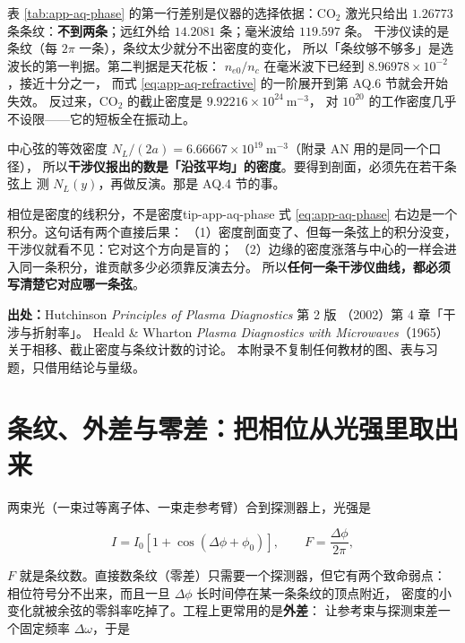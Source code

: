 表 \ref{tab:app-aq-phase} 的第一行差别是仪器的选择依据：CO$_2$ 激光只给出
$1.26773$ 条条纹：\textbf{不到两条}；远红外给 $14.2081$ 条；毫米波给 $119.597$ 条。
干涉仪读的是条纹（每 $2\pi$ 一条），条纹太少就分不出密度的变化，
所以「条纹够不够多」是选波长的第一判据。第二判据是天花板：
$n_{e0}/n_c$ 在毫米波下已经到 $8.96978\times10^{-2}$，接近十分之一，
而式 \eqref{eq:app-aq-refractive} 的一阶展开到第 AQ.6 节就会开始失效。
反过来，CO$_2$ 的截止密度是 $9.92216\times10^{24}\ \mathrm{m^{-3}}$，
对 $10^{20}$ 的工作密度几乎不设限——它的短板全在振动上。

中心弦的等效密度
$N_L/(2a) = 6.66667\times10^{19}\ \mathrm{m^{-3}}$（附录 AN 用的是同一个口径），
所以\textbf{干涉仪报出的数是「沿弦平均」的密度}。要得到剖面，必须先在若干条弦上
测 $N_L(y)$，再做反演。那是 AQ.4 节的事。

\begin{tip}{相位是密度的线积分，不是密度}{tip-app-aq-phase}
式 \eqref{eq:app-aq-phase} 右边是一个积分。这句话有两个直接后果：
（1）密度剖面变了、但每一条弦上的积分没变，干涉仪就看不见：它对这个方向是盲的；
（2）边缘的密度涨落与中心的一样会进入同一条积分，谁贡献多少必须靠反演去分。
所以\textbf{任何一条干涉仪曲线，都必须写清楚它对应哪一条弦}。
\end{tip}

{\footnotesize
\textbf{出处：}Hutchinson \textit{Principles of Plasma Diagnostics} 第 2 版
（2002）第 4 章「干涉与折射率」。
Heald \& Wharton \textit{Plasma Diagnostics with
Microwaves}（1965）关于相移、截止密度与条纹计数的讨论。
本附录不复制任何教材的图、表与习题，只借用结论与量级。
}

\section{条纹、外差与零差：把相位从光强里取出来}
\label{sec:app-aq-heterodyne}

两束光（一束过等离子体、一束走参考臂）合到探测器上，光强是

\begin{equation}
I = I_0\left[1+\cos\left(\Delta\phi+\phi_0\right)\right],
\qquad
F = \frac{\Delta\phi}{2\pi},
\label{eq:app-aq-fringe}
\end{equation}

$F$ 就是条纹数。直接数条纹（零差）只需要一个探测器，但它有两个致命弱点：
相位符号分不出来，而且一旦 $\Delta\phi$ 长时间停在某一条条纹的顶点附近，
密度的小变化就被余弦的零斜率吃掉了。工程上更常用的是\textbf{外差}：
让参考束与探测束差一个固定频率 $\Delta\omega$，于是

